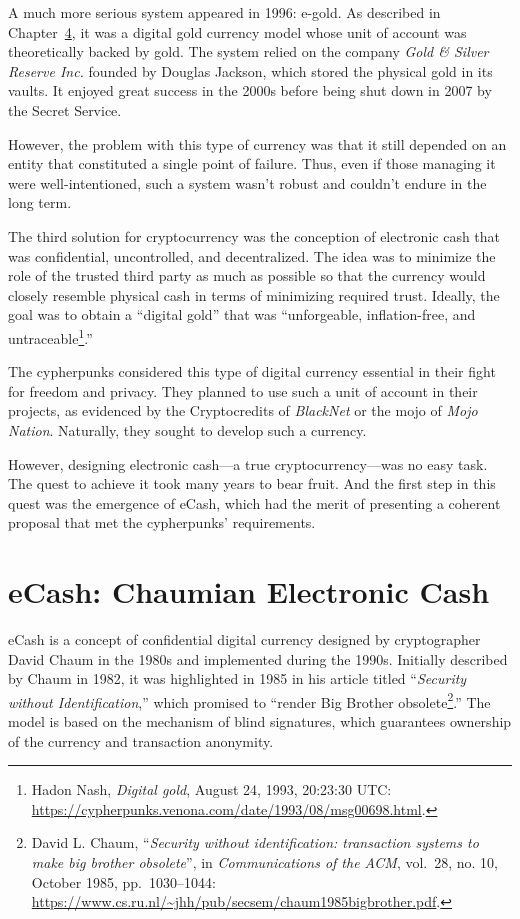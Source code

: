 \documentclass[
  a5paper,
  smalldemyvopaper,10pt,twoside,onecolumn,openright,extrafontsizes,hidelinks]{memoir}
\begin{document}
A much more serious system appeared in 1996: e-gold. As described in
Chapter~\hyperref[ch:adversary]{4}, it was a digital gold currency model
whose unit of account was theoretically backed by gold. The system
relied on the company \emph{Gold \& Silver Reserve Inc.} founded by
Douglas Jackson, which stored the physical gold in its vaults. It
enjoyed great success in the 2000s before being shut down in 2007 by the
Secret Service.

However, the problem with this type of currency was that it still
depended on an entity that constituted a single point of failure. Thus,
even if those managing it were well-intentioned, such a system wasn't
robust and couldn't endure in the long term.

The third solution for cryptocurrency was the conception of electronic
cash that was confidential, uncontrolled, and decentralized. The idea
was to minimize the role of the trusted third party as much as possible
so that the currency would closely resemble physical cash in terms of
minimizing required trust. Ideally, the goal was to obtain a ``digital
gold'' that was ``unforgeable, inflation-free, and
untraceable\footnote{Hadon Nash, \emph{Digital gold}, August 24, 1993,
  20:23:30 UTC:
  \url{https://cypherpunks.venona.com/date/1993/08/msg00698.html}.}.''

The cypherpunks considered this type of digital currency essential in
their fight for freedom and privacy. They planned to use such a unit of
account in their projects, as evidenced by the Cryptocredits of
\emph{BlackNet} or the mojo of \emph{Mojo Nation}. Naturally, they
sought to develop such a currency.

However, designing electronic cash---a true cryptocurrency---was no easy
task. The quest to achieve it took many years to bear fruit. And the
first step in this quest was the emergence of eCash, which had the merit
of presenting a coherent proposal that met the cypherpunks'
requirements.

\section*{eCash: Chaumian Electronic
Cash}\label{ecash-chaumian-electronic-cash}


eCash is a concept of confidential digital currency designed by
cryptographer David Chaum in the 1980s and implemented during the 1990s.
Initially described by Chaum in 1982, it was highlighted in 1985 in his
article titled ``\emph{Security without Identification},'' which
promised to ``render Big Brother obsolete\footnote{David L. Chaum,
  ``\emph{Security without identification: transaction systems to make
  big brother obsolete}'', in \emph{Communications of the ACM}, vol.~28,
  no. 10, October 1985, pp.~1030--1044:
  \url{https://www.cs.ru.nl/~jhh/pub/secsem/chaum1985bigbrother.pdf}.}.''
The model is based on the mechanism of blind signatures, which
guarantees ownership of the currency and transaction anonymity.
\end{document}

